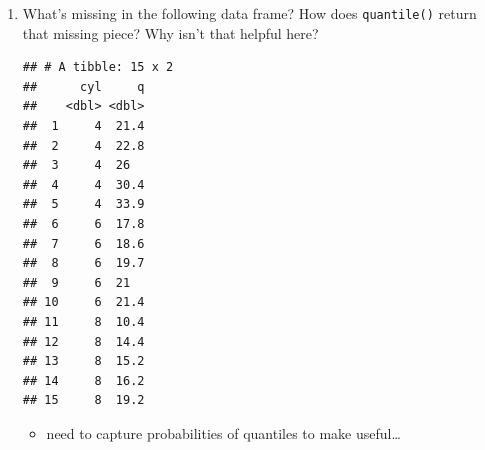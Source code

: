 \documentclass[]{book}
\newenvironment{Shaded}{\begin{snugshade}}{\end{snugshade}}
\newcommand{\DataTypeTok}[1]{\textcolor[rgb]{0.13,0.29,0.53}{#1}}
\newcommand{\FloatTok}[1]{\textcolor[rgb]{0.00,0.00,0.81}{#1}}
\newcommand{\KeywordTok}[1]{\textcolor[rgb]{0.13,0.29,0.53}{\textbf{#1}}}
\newcommand{\NormalTok}[1]{#1}
\newcommand{\OperatorTok}[1]{\textcolor[rgb]{0.81,0.36,0.00}{\textbf{#1}}}
\newcommand{\StringTok}[1]{\textcolor[rgb]{0.31,0.60,0.02}{#1}}
\providecommand{\tightlist}{%
  \setlength{\itemsep}{0pt}\setlength{\parskip}{0pt}}
\theoremstyle{definition}
\theoremstyle{definition}
\theoremstyle{definition}
\theoremstyle{remark}
\begin{document}
\begin{enumerate}
\def\labelenumi{\arabic{enumi}.}
\item
  What's missing in the following data frame? How does
  \texttt{quantile()} return that missing piece? Why isn't that helpful
  here?

\begin{Shaded}
\end{Shaded}

\begin{verbatim}
## # A tibble: 15 x 2
##      cyl     q
##    <dbl> <dbl>
##  1     4  21.4
##  2     4  22.8
##  3     4  26  
##  4     4  30.4
##  5     4  33.9
##  6     6  17.8
##  7     6  18.6
##  8     6  19.7
##  9     6  21  
## 10     6  21.4
## 11     8  10.4
## 12     8  14.4
## 13     8  15.2
## 14     8  16.2
## 15     8  19.2
\end{verbatim}

  \begin{itemize}
  \tightlist
  \item
    need to capture probabilities of quantiles to make useful\ldots{}
  \end{itemize}

\begin{Shaded}
\end{Shaded}


\end{enumerate}
\end{document}
